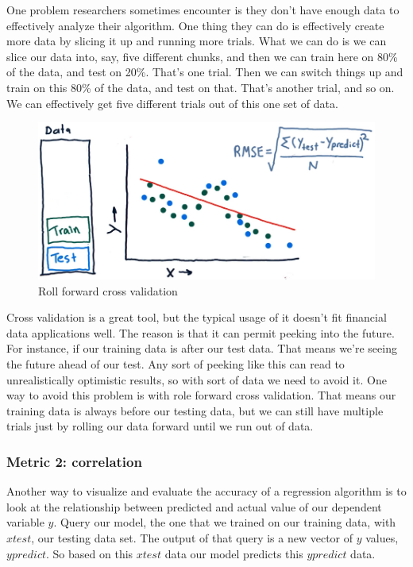 \documentclass[12pt]{article}
\begin{document}
One problem researchers sometimes encounter is they don't have enough data to effectively analyze their algorithm. One thing they can do is effectively create more data by slicing it up and running more trials. What we can do is we can slice our data into, say, five different chunks, and then we can train here on 80\% of the data, and test on 20\%. That's one trial. Then we can switch things up and train on this 80\% of the data, and test on that. That's another trial, and so on. We can effectively get five different trials out of this one set of data. 

\begin{figure}[!ht]
\centering
\includegraphics[scale=0.4]{fig/fig88}
\caption{Roll forward cross validation}
\end{figure}

Cross validation is a great tool, but the typical usage of it doesn't fit financial data applications well. The reason is that it can permit peeking into the future. For instance, if our training data is after our test data. That means we're seeing the future ahead of our test. Any sort of peeking like this can read to unrealistically optimistic results, so with sort of data we need to avoid it. One way to avoid this problem is with role forward cross validation. That means our training data is always before our testing data, but we can still have multiple trials just by rolling our data forward until we run out of data. 

\subsubsection{Metric 2: correlation}

Another way to visualize and evaluate the accuracy of a regression algorithm is to look at the relationship between predicted and actual value of our dependent variable $y$. Query our model, the one that we trained on our training data, with $xtest$, our testing data set. The output of that query is a new vector of $y$ values, $ypredict$. So based on this $xtest$ data our model predicts this $ypredict$ data. 
\end{document}
